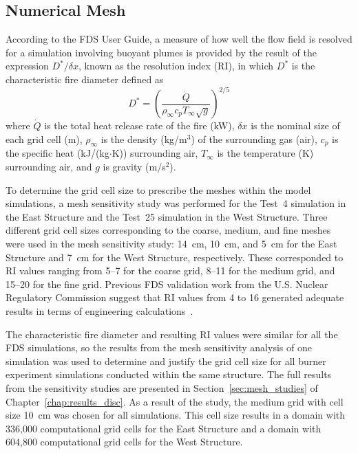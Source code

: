 \subsection{Numerical Mesh}
\label{subsec:mesh}
According to the FDS User Guide, a measure of how well the flow field is resolved for a simulation involving buoyant plumes is provided by the result of the expression $D^*/\delta x$, known as the resolution index (RI), in which $D^*$ is the characteristic fire diameter defined as
\begin{equation}
\label{eq:Dstar}
	D^* = \left( \frac{\dot{Q}}{\rho_\infty c_p T_\infty \sqrt{g}}\right)^{2/5}
\end{equation}
where $\dot{Q}$ is the total heat release rate of the fire (kW), $\delta x$ is the nominal size of each grid cell (m), $\rho_\infty$ is the density (kg/m$^3$) of the surrounding gas (air), $c_p$ is the specific heat (kJ/(kg$\cdot$K)) surrounding air, $T_\infty$ is the temperature (K) surrounding air, and $g$ is gravity (m/s$^2$). 

To determine the grid cell size to prescribe the meshes within the model simulations, a mesh sensitivity study was performed for the Test~4 simulation in the East Structure and the Test~25 simulation in the West Structure. Three different grid cell sizes corresponding to the coarse, medium, and fine meshes were used in the mesh sensitivity study: 14~cm, 10~cm, and 5~cm for the East Structure and 7~cm for the West Structure, respectively. These corresponded to RI values ranging from 5--7 for the coarse grid, 8--11 for the medium grid, and 15--20 for the fine grid. Previous FDS validation work from the U.S. Nuclear Regulatory Commission suggest that RI values from 4 to 16 generated adequate results in terms of engineering calculations~\cite{NUREG_1824}.

The characteristic fire diameter and resulting RI values were similar for all the FDS simulations, so the results from the mesh sensitivity analysis of one simulation was used to determine and justify the grid cell size for all burner experiment simulations conducted within the same structure. The full results from the sensitivity studies are presented in Section~\ref{sec:mesh_studies} of Chapter~\ref{chap:results_disc}. As a result of the study, the medium grid with cell size 10~cm was chosen for all simulations. This cell size results in a domain with 336,000 computational grid cells for the East Structure and a domain with 604,800 computational grid cells for the West Structure.

